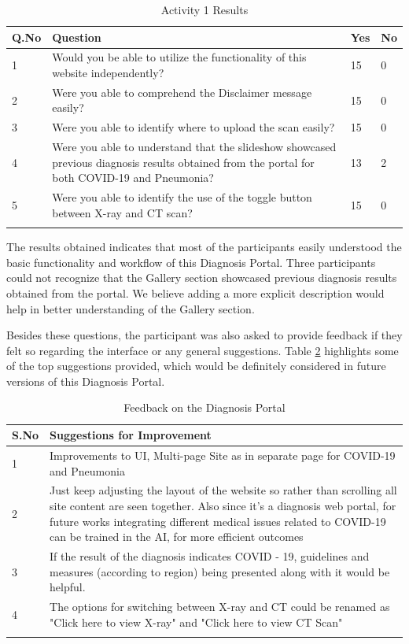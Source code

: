 \begin{longtable}{| p{} | p{} | p{} | p{} |} 
    \hline
    		\textbf{Q.No}    &\textbf{Question} & \textbf{Yes}     & \textbf{No}
\\\hline
            1   &Would you be able to utilize the functionality of this website independently?  &15  &0
\\\hline
            2   &Were you able to comprehend the Disclaimer message easily?  &15  &0
\\\hline
            3   &Were you able to identify where to upload the scan easily?  &15  &0
\\\hline
            4   &Were you able to understand that the slideshow showcased previous diagnosis results obtained from the portal for both COVID-19 and Pneumonia?  &13  &2
\\\hline
            5   &Were you able to identify the use of the toggle button between X-ray and CT scan?  &15  &0
\\\hline

\caption{Activity 1 Results} \label{act:1}
        \end{longtable}

The results obtained indicates that most of the participants easily understood the basic functionality and workflow of this Diagnosis Portal. Three participants could not recognize that the Gallery section showcased previous diagnosis results obtained from the portal. We believe adding a more explicit description would help in better understanding of the Gallery section.

Besides these questions, the participant was also asked to provide feedback if they felt so regarding the interface or any general suggestions. Table \ref{feedback} highlights some of the top suggestions provided, which would be definitely considered in future versions of this Diagnosis Portal.


\begin{longtable}{| p{} | p{} |} 
    \hline
    		\textbf{S.No}    &\textbf{Suggestions for Improvement} 
\\\hline
            1   &Improvements to UI, Multi-page Site as in separate page for COVID-19 and Pneumonia
\\\hline
            2   &Just keep adjusting the layout of the website so rather than scrolling all site content are seen together. Also since it's a diagnosis web portal, for future works integrating different medical issues related to COVID-19 can be trained in the AI, for more efficient outcomes
\\\hline
            3   &If the result of the diagnosis indicates COVID - 19, guidelines and measures (according to region) being presented along with it would be helpful.
\\\hline
          4   &The options for switching between X-ray and CT could be renamed as "Click here to view X-ray" and "Click here to view CT Scan"
\\\hline

\caption{Feedback on the Diagnosis Portal} \label{feedback}
        \end{longtable}

